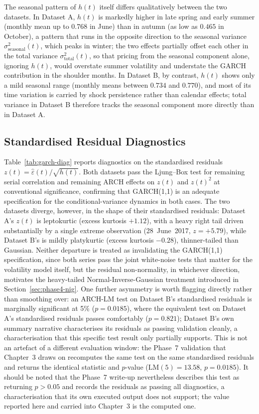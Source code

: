 \documentclass[11pt, a4paper, twoside]{article}
\begin{document}
The seasonal pattern of $h(t)$ itself differs qualitatively between the two datasets. In Dataset A, $h(t)$ is markedly higher in late spring and early summer (monthly mean up to $0.768$ in June) than in autumn (as low as $0.465$ in October), a pattern that runs in the opposite direction to the seasonal variance $\sigma^2_{\text{seasonal}}(t)$, which peaks in winter; the two effects partially offset each other in the total variance $\sigma^2_{\text{total}}(t)$, so that pricing from the seasonal component alone, ignoring $h(t)$, would overstate summer volatility and understate the GARCH contribution in the shoulder months. In Dataset B, by contrast, $h(t)$ shows only a mild seasonal range (monthly means between $0.734$ and $0.770$), and most of its time variation is carried by shock persistence rather than calendar effects; total variance in Dataset B therefore tracks the seasonal component more directly than in Dataset A.

\subsection{Standardised Residual Diagnostics}
\label{sec:phase3-diag}

Table~\ref{tab:garch-diag} reports diagnostics on the standardised residuals $z(t) = \hat\varepsilon(t)/\sqrt{h(t)}$. Both datasets pass the Ljung--Box test for remaining serial correlation and remaining ARCH effects on $z(t)$ and $z(t)^2$ at conventional significance, confirming that GARCH(1,1) is an adequate specification for the conditional-variance dynamics in both cases. The two datasets diverge, however, in the shape of their standardised residuals: Dataset A's $z(t)$ is leptokurtic (excess kurtosis $+1.12$), with a heavy right tail driven substantially by a single extreme observation (28~June~2017, $z = +5.79$), while Dataset B's is mildly platykurtic (excess kurtosis $-0.28$), thinner-tailed than Gaussian. Neither departure is treated as invalidating the GARCH(1,1) specification, since both series pass the joint white-noise tests that matter for the volatility model itself, but the residual non-normality, in whichever direction, motivates the heavy-tailed Normal-Inverse-Gaussian treatment introduced in Section~\ref{sec:phase4-nig}. One further asymmetry is worth flagging directly rather than smoothing over: an ARCH-LM test on Dataset B's standardised residuals is marginally significant at 5\% ($p = 0.0185$), where the equivalent test on Dataset A's standardised residuals passes comfortably ($p = 0.821$); Dataset B's own summary narrative characterises its residuals as passing validation cleanly, a characterisation that this specific test result only partially supports. This is not an artefact of a different evaluation window: the Phase~7 validation that Chapter~3 draws on recomputes the same test on the same standardised residuals and returns the identical statistic and $p$-value ($\mathrm{LM}(5) = 13.58$, $p = 0.0185$). It should be noted that the Phase~7 write-up nevertheless describes this test as returning $p > 0.05$ and records the residuals as passing all diagnostics, a characterisation that its own executed output does not support; the value reported here and carried into Chapter~3 is the computed one.
\end{document}
